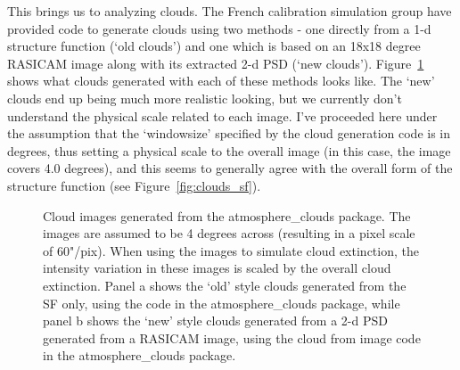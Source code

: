 \documentclass[11pt,preprint]{aastex}
\begin{document}
This brings us to analyzing clouds. The French calibration simulation group have provided code to generate clouds using two methods - one directly from a 1-d structure function (`old clouds') and one which is based on an 18x18 degree RASICAM image along with its extracted 2-d PSD (`new clouds').  Figure~\ref{fig:clouds_images} shows what clouds generated with each of these methods looks like. The `new' clouds end up being much more realistic looking, but we currently don't understand the physical scale related to each image. I've proceeded here under the assumption that the `windowsize' specified by the cloud generation code is in degrees, thus setting a physical scale to the overall image (in this case, the image covers 4.0 degrees), and this seems to generally agree with the overall form of the structure function (see Figure~\ref{fig:clouds_sf}).  

\begin{figure}[htpb]
\centering
{}
\caption{{\small
Cloud images generated from the atmosphere\_clouds package. The images are assumed to be 4 degrees across (resulting in a pixel scale of  60"/pix). When using the images to simulate cloud extinction, the intensity variation in these images is scaled by the overall cloud extinction. Panel a shows the `old' style clouds generated from the SF only, using the code in the atmosphere\_clouds package, while panel b shows the `new' style clouds generated from a 2-d PSD generated from a RASICAM image, using the cloud from image code in the atmosphere\_clouds package.}}
\label{fig:clouds_images}
\end{figure}
\end{document}
